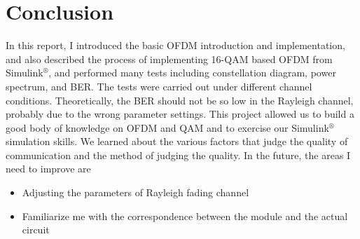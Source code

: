 \documentclass[11pt]{article}
\numberwithin{figure}{section}
\numberwithin{equation}{section}
\begin{document}
\part{Conclusion}
In this report, I introduced the basic OFDM introduction and implementation, and also described the process of implementing 16-QAM based OFDM from Simulink$^\circledR$, and performed many tests including constellation diagram, power spectrum, and BER. The tests were carried out under different channel conditions. Theoretically, the BER should not be so low in the Rayleigh channel, probably due to the wrong parameter settings.
This project allowed us to build a good body of knowledge on OFDM and QAM and to exercise our Simulink$^\circledR$ simulation skills. We learned about the various factors that judge the quality of communication and the method of judging the quality.
In the future, the areas I need to improve are
\begin{itemize}
    \item Adjusting the parameters of Rayleigh fading channel
    \item Familiarize me with the correspondence between the module and the actual circuit
\end{itemize}
\pagebreak


\end{document}
